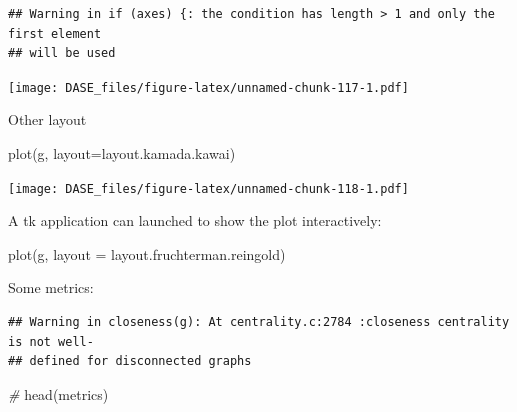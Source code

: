 \documentclass[
]{book}
\newenvironment{Shaded}{\begin{snugshade}}{\end{snugshade}}
\newcommand{\AttributeTok}[1]{\textcolor[rgb]{0.77,0.63,0.00}{#1}}
\newcommand{\CommentTok}[1]{\textcolor[rgb]{0.56,0.35,0.01}{\textit{#1}}}
\newcommand{\FunctionTok}[1]{\textcolor[rgb]{0.00,0.00,0.00}{#1}}
\newcommand{\NormalTok}[1]{#1}
\newcommand{\OtherTok}[1]{\textcolor[rgb]{0.56,0.35,0.01}{#1}}
\newcommand{\SpecialCharTok}[1]{\textcolor[rgb]{0.00,0.00,0.00}{#1}}
\begin{document}
\begin{verbatim}
## Warning in if (axes) {: the condition has length > 1 and only the first element
## will be used
\end{verbatim}

\texttt{[image: DASE\_files/figure-latex/unnamed-chunk-117-1.pdf]}

Other layout

\begin{Shaded}
\begin{Highlighting}[]
\FunctionTok{plot}\NormalTok{(g, }\AttributeTok{layout=}\NormalTok{layout.kamada.kawai)}
\end{Highlighting}
\end{Shaded}

\texttt{[image: DASE\_files/figure-latex/unnamed-chunk-118-1.pdf]}

A tk application can launched to show the plot interactively:

\begin{Shaded}
\begin{Highlighting}[]
\FunctionTok{plot}\NormalTok{(g, }\AttributeTok{layout =}\NormalTok{ layout.fruchterman.reingold)}
\end{Highlighting}
\end{Shaded}

Some metrics:

\begin{Shaded}
\end{Shaded}

\begin{verbatim}
## Warning in closeness(g): At centrality.c:2784 :closeness centrality is not well-
## defined for disconnected graphs
\end{verbatim}

\begin{Shaded}
\begin{Highlighting}[]
\CommentTok{\#}
\FunctionTok{head}\NormalTok{(metrics)}
\end{Highlighting}
\end{Shaded}
\end{document}
